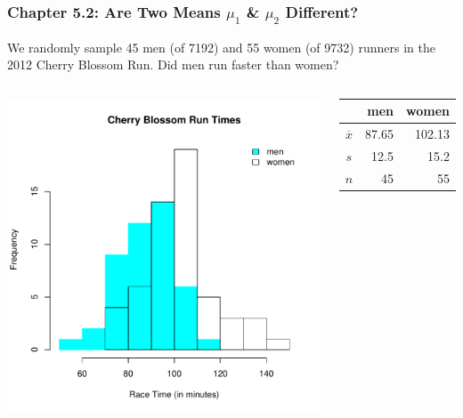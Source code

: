 \documentclass[handout]{beamer}
\begin{document}
%
%
\begin{frame}[fragile]
\frametitle{Chapter 5.2: Are Two Means $\mu_1$ \& $\mu_2$ Different?}

We randomly sample 45 men (of 7192) and 55 women (of 9732) runners in the 2012 Cherry Blossom Run. Did men run faster than women?

\begin{columns}
\pause{}
\begin{center}
\includegraphics[width=\textwidth]{figure/race.pdf}
\end{center}
\pause{}
\begin{center}
\begin{tabular}{c|rr}
     & men & women \\ 
\hline
    $\overline{x}$ & 87.65 & 102.13 \\ 
    $s$ & 12.5 & 15.2 \\ 
    $n$ & 45 & 55 \\ 
\end{tabular}
\end{center}
\end{columns}


\end{frame}
\end{document}
